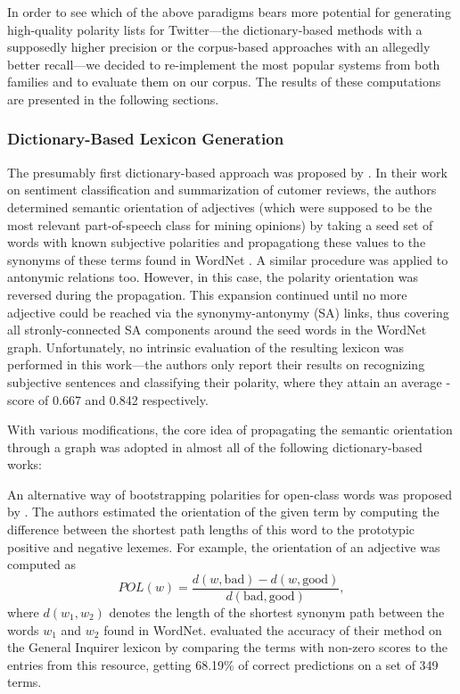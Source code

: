 In order to see which of the above paradigms bears more potential for
generating high-quality polarity lists for Twitter---the
dictionary-based methods with a supposedly higher precision or the
corpus-based approaches with an allegedly better recall---we decided
to re-implement the most popular systems from both families and to
evaluate them on our corpus.  The results of these computations are
presented in the following sections.

\subsubsection{Dictionary-Based Lexicon Generation}

The presumably first dictionary-based approach was proposed by
\citet{Hu:04}.  In their work on sentiment classification and
summarization of cutomer reviews, the authors determined semantic
orientation of adjectives (which were supposed to be the most relevant
part-of-speech class for mining opinions) by taking a seed set of
words with known subjective polarities and propagationg these values
to the synonyms of these terms found in WordNet \cite{Miller:95}.  A
similar procedure was applied to antonymic relations too.  However, in
this case, the polarity orientation was reversed during the
propagation.  This expansion continued until no more adjective could
be reached via the synonymy-antonymy (SA) links, thus covering all
stronly-connected SA components around the seed words in the WordNet
graph.  Unfortunately, no intrinsic evaluation of the resulting
lexicon was performed in this work---the authors only report their
results on recognizing subjective sentences and classifying their
polarity, where they attain an average \F-score of 0.667 and 0.842
respectively.

With various modifications, the core idea of propagating the semantic
orientation through a graph was adopted in almost all of the following
dictionary-based works:

\cite{Kim:06}

An alternative way of bootstrapping polarities for open-class words
was proposed by \cite{Kamps:04}.  The authors estimated the
orientation of the given term by computing the difference between the
shortest path lengths of this word to the prototypic positive and
negative lexemes.  For example, the orientation of an adjective was
computed as
\begin{equation*}
  POL(w) = \frac{d(w, \textrm{bad}) - d(w, \textrm{good})}%
  {d(\textrm{bad}, \textrm{good})},
\end{equation*}
where $d(w_1, w_2)$ denotes the length of the shortest synonym path
between the words $w_1$ and $w_2$ found in WordNet.  \cite{Kamps:04}
evaluated the accuracy of their method on the General Inquirer lexicon
\cite{Stone:66} by comparing the terms with non-zero scores to the
entries from this resource, getting 68.19\% of correct predictions on
a set of 349 terms.

